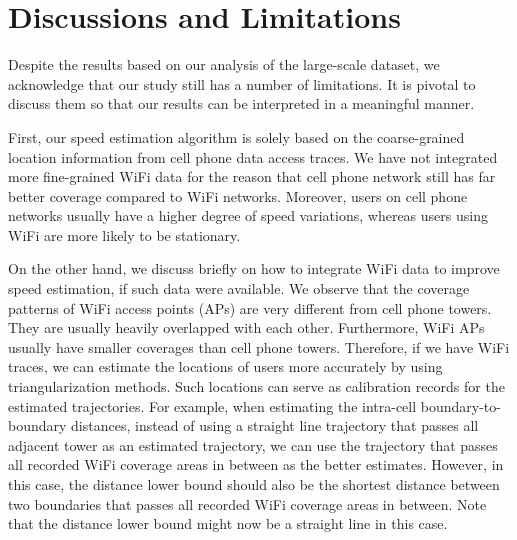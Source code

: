 \section{Discussions and Limitations}
\label{limitation}

Despite the results based on our analysis of the large-scale dataset, we acknowledge that our study still has a number of limitations. It is pivotal to discuss them so that our results can be interpreted in a meaningful manner.



First, our speed estimation algorithm is solely based on the coarse-grained location information from cell phone data access traces. We have not integrated more fine-grained WiFi data for the reason that cell phone network still has far better coverage compared to WiFi networks. Moreover, users on cell phone networks usually have a higher degree of speed variations, whereas users using WiFi are more likely to be stationary.

On the other hand, we discuss briefly on how to integrate WiFi data to improve speed estimation, if such data were available. We observe that the coverage patterns of WiFi access points (APs) are very different from cell phone towers. They are usually heavily overlapped with each other. Furthermore, WiFi APs usually have smaller coverages than cell phone towers. Therefore, if we have WiFi traces, we can estimate the locations of users more accurately by using triangularization methods. Such locations can serve as calibration records for the estimated trajectories. For example, when estimating the intra-cell boundary-to-boundary distances, instead of using a straight line trajectory that passes all adjacent tower as an estimated trajectory, we can use the trajectory that passes all recorded WiFi coverage areas in between as the better estimates. However, in this case, the distance lower bound should also be the shortest distance between two boundaries that passes all recorded WiFi coverage areas in between. Note that the distance lower bound might now be a straight line in this case.

